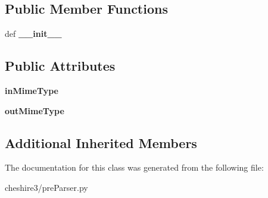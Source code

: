 \subsection*{Public Member Functions}
\begin{DoxyCompactItemize}
\item 
\hypertarget{classcheshire3_1_1pre_parser_1_1_typed_pre_parser_abdd0878d793ffe02e9e5c52e32b64679}{def {\bfseries \-\_\-\-\_\-init\-\_\-\-\_\-}}\label{classcheshire3_1_1pre_parser_1_1_typed_pre_parser_abdd0878d793ffe02e9e5c52e32b64679}

\end{DoxyCompactItemize}
\subsection*{Public Attributes}
\begin{DoxyCompactItemize}
\item 
\hypertarget{classcheshire3_1_1pre_parser_1_1_typed_pre_parser_a0dae7ec269363c5a13728a4d301c39f3}{{\bfseries in\-Mime\-Type}}\label{classcheshire3_1_1pre_parser_1_1_typed_pre_parser_a0dae7ec269363c5a13728a4d301c39f3}

\item 
\hypertarget{classcheshire3_1_1pre_parser_1_1_typed_pre_parser_a1131e524483350300e37c21f79b5a912}{{\bfseries out\-Mime\-Type}}\label{classcheshire3_1_1pre_parser_1_1_typed_pre_parser_a1131e524483350300e37c21f79b5a912}

\end{DoxyCompactItemize}
\subsection*{Additional Inherited Members}


The documentation for this class was generated from the following file\-:\begin{DoxyCompactItemize}
\item 
cheshire3/pre\-Parser.\-py\end{DoxyCompactItemize}
